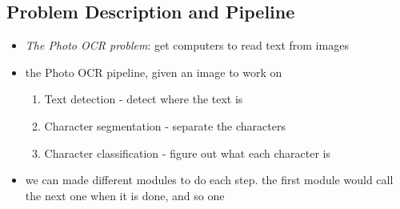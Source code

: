 \documentclass[]{article}
\begin{document}
	\subsection{Problem Description and Pipeline}
		\begin{itemize}
			\item \emph{The Photo OCR problem}: get computers to read text from images
			\item the Photo OCR pipeline, given an image to work on
			\begin{enumerate}
				\item Text detection - detect where the text is
				\item Character segmentation - separate the characters
				\item Character classification - figure out what each character is
			\end{enumerate}
			\item we can made different modules to do each step. the first module would call the next one when it is done, and so one
		\end{itemize}
		
\end{document}
